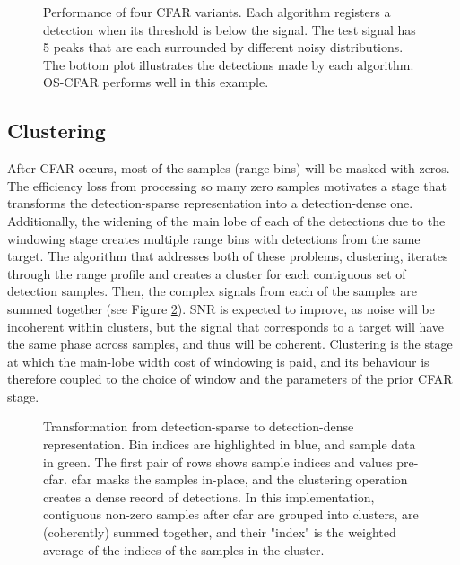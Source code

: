 \begin{figure}
    \centering
    \caption{ Performance of four CFAR variants. Each 
    algorithm registers a detection when its threshold is 
    below the signal. The test signal has 5 peaks that are 
    each surrounded by different noisy distributions. The bottom 
    plot illustrates the detections made by each algorithm. 
    OS-CFAR performs well in this example.}
    \label{fig:cfar-algorithms}
\end{figure}
\subsection{Clustering}
After CFAR occurs, most of the samples (range bins) will be masked with zeros. The 
efficiency loss from processing so many zero samples motivates a stage that transforms 
the detection-sparse representation into a detection-dense one. Additionally, the 
widening of the main lobe of each of the detections due to the windowing stage creates 
multiple range bins with detections from the same target. The algorithm that addresses 
both of these problems, clustering, iterates through the range profile and creates a 
cluster for each contiguous set of detection samples. Then, the complex signals from 
each of the samples are summed together (see Figure \ref{fig:clustering-sparse-dense}). 
SNR is expected to improve, as noise will be incoherent within clusters, but the signal 
that corresponds to a target will have the same phase across samples, and thus will be 
coherent. Clustering is the stage at which the main-lobe width cost of windowing is paid, 
and its behaviour is therefore coupled to the choice of window and the parameters of 
the prior CFAR stage.

\begin{figure}
    \caption[Transformation of sparse detections to dense representation]
    {Transformation from detection-sparse to detection-dense representation.
    Bin indices are highlighted in blue, and sample data in green. The first 
    pair of rows shows sample indices and values pre-\gls{cfar}. \gls{cfar}
    masks the samples in-place, and the clustering operation creates a 
    dense record of detections. In this implementation, contiguous non-zero samples 
    after \gls{cfar} are grouped into clusters, are (coherently) summed together, 
    and their "index"
    is the weighted average of the indices of the samples in the cluster.}
    \label{fig:clustering-sparse-dense}
\end{figure}

